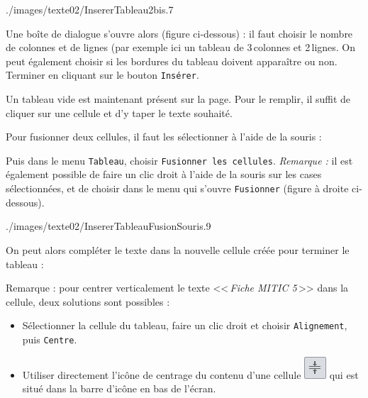   

%
                {./images/texte02/InsererTableau2bis}{.7\textwidth}  



Une boîte de dialogue s'ouvre alors (figure ci-dessous) : il faut choisir le nombre de colonnes et de lignes (par exemple ici un tableau de 3\,colonnes et 2\,lignes. On peut également choisir si les bordures du tableau doivent apparaître ou non. Terminer en cliquant sur le bouton \texttt{Insérer}.  


Un tableau vide est maintenant présent sur la page. Pour le remplir, il suffit de cliquer sur une cellule et d'y taper le texte souhaité.


Pour fusionner deux cellules, il faut les sélectionner à l'aide de la souris :


Puis dans le menu \texttt{Tableau}, choisir \texttt{Fusionner les cellules}. \emph{Remarque :} il est également possible de faire un clic droit à l'aide de la souris sur les cases sélectionnées, et de choisir dans le menu qui s'ouvre \texttt{Fusionner} (figure à droite ci-dessous).  

%
                {./images/texte02/InsererTableauFusionSouris}{.9\textwidth}  




On peut alors compléter le texte dans la nouvelle cellule créée pour terminer le tableau :


\vspace{24pt}



Remarque : pour centrer verticalement le texte <<\,\emph{Fiche MITIC 5}\,>> dans la cellule, deux solutions sont possibles :

\begin{itemize}
\item Sélectionner la cellule du tableau, faire un clic droit et choisir \texttt{Alignement}, puis \texttt{Centre}.  


\item Utiliser directement l'icône de centrage du contenu d'une cellule \includegraphics[width=.6cm]{./images/texte02/iconeTableauCentrage} qui est situé dans la barre d'icône en bas de l'écran.
\end{itemize}  


